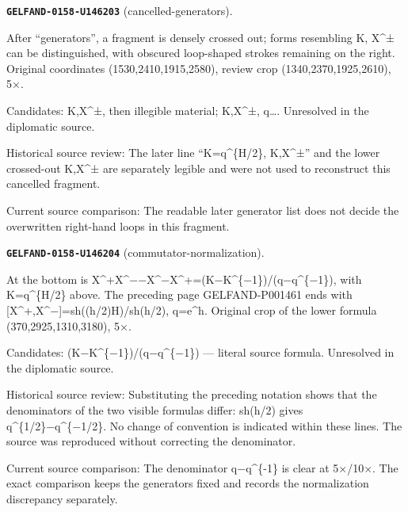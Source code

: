\par\noindent\leavevmode{}\label{GELFAND-0158-U146203}\label{GELFAND-P001462:cancelled-generators}\textbf{\texttt{GELFAND-0158-U146203}} (cancelled-generators).\nopagebreak[4]\par
After “generators”, a fragment is densely crossed out; forms resembling K, X\textasciicircum{}± can be distinguished, with obscured loop-shaped strokes remaining on the right. Original coordinates (1530,2410,1915,2580), review crop (1340,2370,1925,2610), 5×.\par
Candidates: K,X\textasciicircum{}±, then illegible material; K,X\textasciicircum{}±, q…. Unresolved in the diplomatic source.\par
Historical source review: The later line “K=q\textasciicircum{}\{H/2\}, K,X\textasciicircum{}±” and the lower crossed-out K,X\textasciicircum{}± are separately legible and were not used to reconstruct this cancelled fragment.\par
Current source comparison: The readable later generator list does not decide the overwritten right-hand loops in this fragment.\par\medskip
\par\noindent\leavevmode{}\label{GELFAND-0158-U146204}\label{GELFAND-P001462:commutator-normalization}\textbf{\texttt{GELFAND-0158-U146204}} (commutator-normalization).\nopagebreak[4]\par
At the bottom is X\textasciicircum{}+X\textasciicircum{}−−X\textasciicircum{}−X\textasciicircum{}+=(K−K\textasciicircum{}\{−1\})/(q−q\textasciicircum{}\{−1\}), with K=q\textasciicircum{}\{H/2\} above. The preceding page GELFAND-P001461 ends with [X\textasciicircum{}+,X\textasciicircum{}−]=sh((h/2)H)/sh(h/2), q=e\textasciicircum{}h. Original crop of the lower formula (370,2925,1310,3180), 5×.\par
Candidates: (K−K\textasciicircum{}\{−1\})/(q−q\textasciicircum{}\{−1\}) — literal source formula. Unresolved in the diplomatic source.\par
Historical source review: Substituting the preceding notation shows that the denominators of the two visible formulas differ: sh(h/2) gives q\textasciicircum{}\{1/2\}−q\textasciicircum{}\{−1/2\}. No change of convention is indicated within these lines. The source was reproduced without correcting the denominator.\par
Current source comparison: The denominator q−q\textasciicircum{}\{-1\} is clear at 5×/10×. The exact comparison keeps the generators fixed and records the normalization discrepancy separately.\par\medskip
